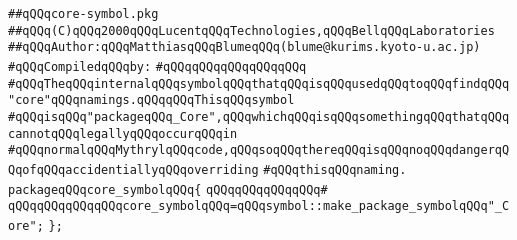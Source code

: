 \label{src/lib/compiler/front/typer-stuff/basics/core-symbol.pkg}
\verb|##qQQqcore-symbol.pkg|\newline
\verb|##qQQq(C)qQQq2000qQQqLucentqQQqTechnologies,qQQqBellqQQqLaboratories|\newline
\verb|##qQQqAuthor:qQQqMatthiasqQQqBlumeqQQq(blume@kurims.kyoto-u.ac.jp)|\newline
\newline
\verb|#qQQqCompiledqQQqby:|\newline
\verb|#qQQqqQQqqQQqqQQqqQQq|\newline
\newline
\newline
\verb|#qQQqTheqQQqinternalqQQqsymbolqQQqthatqQQqisqQQqusedqQQqtoqQQqfindqQQq"core"qQQqnamings.qQQqqQQqThisqQQqsymbol|\newline
\verb|#qQQqisqQQq"packageqQQq_Core",qQQqwhichqQQqisqQQqsomethingqQQqthatqQQqcannotqQQqlegallyqQQqoccurqQQqin|\newline
\verb|#qQQqnormalqQQqMythrylqQQqcode,qQQqsoqQQqthereqQQqisqQQqnoqQQqdangerqQQqofqQQqaccidentiallyqQQqoverriding|\newline
\verb|#qQQqthisqQQqnaming.|\newline
\newline
\verb|packageqQQqcore_symbolqQQq{|\newline
\verb|qQQqqQQqqQQqqQQq#|\newline
\verb|qQQqqQQqqQQqqQQqcore_symbolqQQq=qQQqsymbol::make_package_symbolqQQq"_Core";|\newline
\verb|};|\newline

